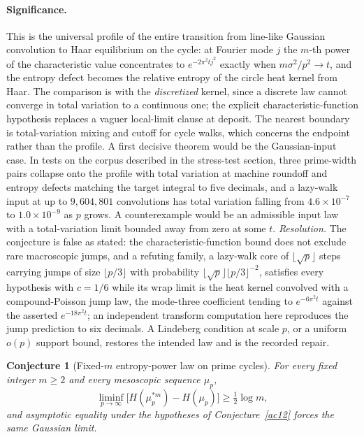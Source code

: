 \documentclass[11pt]{article}
\newtheorem{conjecture}{Conjecture}
\theoremstyle{definition}
\begin{document}
\paragraph{Significance.}
This is the universal profile of the entire transition from line-like Gaussian convolution to Haar equilibrium on the cycle: at Fourier mode $j$ the $m$-th power of the characteristic value concentrates to $e^{-2\pi^2tj^2}$ exactly when $m\sigma^2/p^2\to t$, and the entropy defect becomes the relative entropy of the circle heat kernel from Haar.  The comparison is with the \emph{discretized} kernel, since a discrete law cannot converge in total variation to a continuous one; the explicit characteristic-function hypothesis replaces a vaguer local-limit clause at deposit.  The nearest boundary is total-variation mixing and cutoff for cycle walks, which concerns the endpoint rather than the profile.  A first decisive theorem would be the Gaussian-input case.  In tests on the corpus described in the stress-test section, three prime-width pairs collapse onto the profile with total variation at machine roundoff and entropy defects matching the target integral to five decimals, and a lazy-walk input at up to $9{,}604{,}801$ convolutions has total variation falling from $4.6\times10^{-7}$ to $1.0\times10^{-9}$ as $p$ grows.  A counterexample would be an admissible input law with a total-variation limit bounded away from zero at some $t$.  \emph{Resolution.}  The conjecture is false as stated: the characteristic-function bound does not exclude rare macroscopic jumps, and a refuting family, a lazy-walk core of $\lfloor\sqrt p\rfloor$ steps carrying jumps of size $\lfloor p/3\rfloor$ with probability $\lfloor\sqrt p\rfloor\lfloor p/3\rfloor^{-2}$, satisfies every hypothesis with $c=1/6$ while its wrap limit is the heat kernel convolved with a compound-Poisson jump law, the mode-three coefficient tending to $e^{-6\pi^2t}$ against the asserted $e^{-18\pi^2t}$; an independent transform computation here reproduces the jump prediction to six decimals.  A Lindeberg condition at scale $p$, or a uniform $o(p)$ support bound, restores the intended law and is the recorded repair.

\begin{conjecture}[Fixed-$m$ entropy-power law on prime cycles]\label{ac14}
For every fixed integer $m\ge2$ and every mesoscopic sequence $\mu_p$,
\[
\liminf_{p\to\infty}\bigl[H(\mu_p^{*m})-H(\mu_p)\bigr]\ge\tfrac12\log m,
\]
and asymptotic equality under the hypotheses of Conjecture~\ref{ac12} forces the same Gaussian limit.
\end{conjecture}
\end{document}
